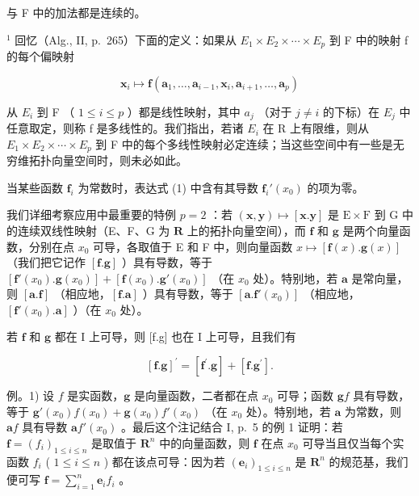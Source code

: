 与 F 中的加法都是连续的。

\(^{1}\) 回忆（Alg., II, p.~265）下面的定义：如果从 \(E_{1} \times E_{2} \times \cdots \times E_{p}\) 到 F 中的映射 f 的每个偏映射

\[
\mathbf {x} _ {i} \mapsto \mathbf {f} (\mathbf {a} _ {1}, \dots , \mathbf {a} _ {i - 1}, \mathbf {x} _ {i}, \mathbf {a} _ {i + 1}, \dots , \mathbf {a} _ {p})
\]

从 \(E_{i}\) 到 F （ \(1 \leqslant i \leqslant p\) ）都是线性映射，其中 \(a_{j}\) （对于 \(j \neq i\) 的下标）在 \(E_{j}\) 中任意取定，则称 f 是多线性的。我们指出，若诸 \(E_{i}\) 在 R 上有限维，则从 \(E_{1} \times E_{2} \times \cdots \times E_{p}\) 到 F 中的每个多线性映射必定连续；当这些空间中有一些是无穷维拓扑向量空间时，则未必如此。

当某些函数 \(\mathbf{f}_i\) 为常数时，表达式 (1) 中含有其导数 \(\mathbf{f}_i'(x_0)\) 的项为零。

我们详细考察应用中最重要的特例 \(p = 2\) ：若 \((\mathbf{x}, \mathbf{y}) \mapsto [\mathbf{x}.\mathbf{y}]\) 是 \(\mathrm{E} \times \mathrm{F}\) 到 \(\mathrm{G}\) 中的连续双线性映射（E、F、G 为 \(\mathbf{R}\) 上的拓扑向量空间），而 \(\mathbf{f}\) 和 \(\mathbf{g}\) 是两个向量函数，分别在点 \(x_0\) 可导，各取值于 E 和 F 中，则向量函数 \(x \mapsto [\mathbf{f}(x).\mathbf{g}(x)]\) （我们把它记作 \([\mathbf{f}.\mathbf{g}]\) ）具有导数，等于 \([\mathbf{f}'(x_0).\mathbf{g}(x_0)] + [\mathbf{f}(x_0).\mathbf{g}'(x_0)]\) （在 \(x_0\) 处）。特别地，若 \(\mathbf{a}\) 是常向量，则 \([\mathbf{a}.\mathbf{f}]\) （相应地，\([\mathbf{f}.\mathbf{a}]\) ）具有导数，等于 \([\mathbf{a}.\mathbf{f}'(x_0)]\) （相应地，\([\mathbf{f}'(x_0).\mathbf{a}]\) ）（在 \(x_0\) 处）。

若 \(\mathbf{f}\) 和 \(\mathbf{g}\) 都在 I 上可导，则 {[}f.g{]} 也在 I 上可导，且我们有

\[
\left[ \mathbf {f}. \mathbf {g} \right] ^ {\prime} = \left[ \mathbf {f} ^ {\prime}. \mathbf {g} \right] + \left[ \mathbf {f}. \mathbf {g} ^ {\prime} \right].\tag{2}
\]

例。1) 设 \(f\) 是实函数，\(\mathbf{g}\) 是向量函数，二者都在点 \(x_0\) 可导；函数 \(\mathbf{g}f\) 具有导数，等于 \(\mathbf{g}'(x_0)f(x_0) + \mathbf{g}(x_0)f'(x_0)\) （在 \(x_0\) 处）。特别地，若 \(\mathbf{a}\) 为常数，则 \(\mathbf{a}f\) 具有导数 \(\mathbf{a}f'(x_0)\) 。最后这个注记结合 I, p.~5 的例 1 证明：若 \(\mathbf{f} = (f_i)_{1 \leqslant i \leqslant n}\) 是取值于 \(\mathbf{R}^n\) 中的向量函数，则 \(\mathbf{f}\) 在点 \(x_0\) 可导当且仅当每个实函数 \(f_i\) ( \(1 \leqslant i \leqslant n\) ) 都在该点可导：因为若 \((\mathbf{e}_i)_{1 \leqslant i \leqslant n}\) 是 \(\mathbf{R}^n\) 的规范基，我们便可写 \(\mathbf{f} = \sum_{i=1}^{n} \mathbf{e}_i f_i\) 。

